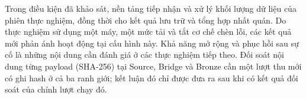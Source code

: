 Trong điều kiện đã khảo sát, nền tảng tiếp nhận và xử lý khối lượng dữ liệu của phiên thực nghiệm, đồng thời cho kết quả lưu trữ và tổng hợp nhất quán. Do thực nghiệm sử dụng một máy, một mức tải và tắt cơ chế chèn lỗi, các kết quả mới phản ánh hoạt động tại cấu hình này. Khả năng mở rộng và phục hồi sau sự cố là những nội dung cần đánh giá ở các thực nghiệm tiếp theo. Đối soát nội dung từng payload (SHA-256) tại Source, Bridge và Bronze cần một lượt thu mới có ghi hash ở cả ba ranh giới; kết luận đó chỉ được đưa ra sau khi có kết quả đối soát của chính lượt chạy đó.